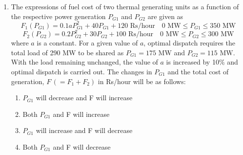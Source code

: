 \documentclass[journal]{IEEEtran}
\numberwithin{equation}{enumi}
\numberwithin{figure}{enumi}
\begin{document}
\begin{enumerate}
\begin{enumerate}
\end{enumerate}
\bigskip
\item The expressions of fuel cost of two thermal generating units as a function of the respective power generation $P_{G1}$ and $P_{G2}$ are given as
\[
F_1(P_{G1}) = 0.1a P_{G1}^2 + 40 P_{G1} + 120 \text{ Rs/hour} \quad 0 \text{ MW} \leq P_{G1} \leq 350 \text{ MW}
\]
\[
F_2(P_{G2}) = 0.2 P_{G2}^2 + 30 P_{G2} + 100 \text{ Rs/hour} \quad 0 \text{ MW} \leq P_{G2} \leq 300 \text{ MW}
\]
where $a$ is a constant. For a given value of $a$, optimal dispatch requires the total load of 290 MW to be shared as $P_{G1} = 175 \text{ MW}$ and $P_{G2} = 115 \text{ MW}$. With the load remaining unchanged, the value of $a$ is increased by 10\% and optimal dispatch is carried out. The changes in $P_{G1}$ and the total cost of generation, $F \,(= F_1 + F_2)$ in Rs/hour will be as follows:
\begin{enumerate}

        \item $P_{G1}$ will decrease and F will increase
        \item Both $P_{G1}$ and F will increase
        \item $P_{G1}$ will increase and F will decrease
        \item Both $P_{G1}$ and F will decrease
    

\end{enumerate}
\end{enumerate}
\end{document}
